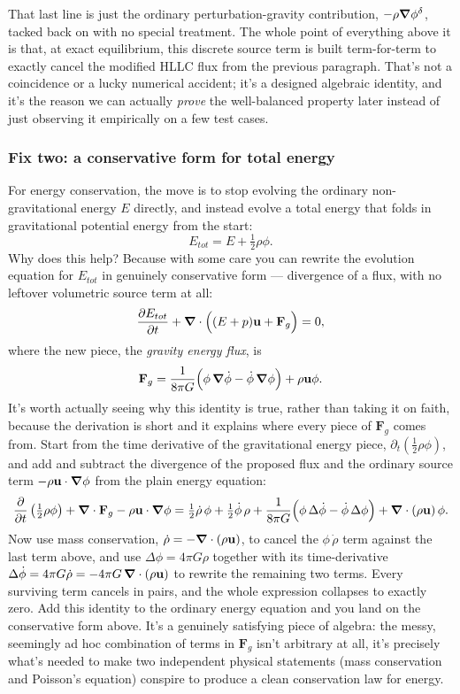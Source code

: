 That last line is just the ordinary perturbation-gravity contribution, $-\rho\grad\phi^\delta$, tacked back on with no special treatment. The whole point of everything above it is that, at exact equilibrium, this discrete source term is built term-for-term to exactly cancel the modified HLLC flux from the previous paragraph. That's not a coincidence or a lucky numerical accident; it's a designed algebraic identity, and it's the reason we can actually \emph{prove} the well-balanced property later instead of just observing it empirically on a few test cases.

\subsubsection{Fix two: a conservative form for total energy}

For energy conservation, the move is to stop evolving the ordinary non-gravitational energy $E$ directly, and instead evolve a total energy that folds in gravitational potential energy from the start:
\[
	E_{tot} = E + \tfrac12 \rho\phi.
\]
Why does this help? Because with some care you can rewrite the evolution equation for $E_{tot}$ in genuinely conservative form — divergence of a flux, with no leftover volumetric source term at all:
\[
	\pdv{E_{tot}}{t} + \grad\cdot\Big((E+p)\mathbf{u} + \mathbf{F}_g\Big) = 0,
\]
where the new piece, the \emph{gravity energy flux}, is
\[
	\mathbf{F}_g = \frac{1}{8\pi G}\Big(\phi\,\grad\dot\phi - \dot\phi\,\grad\phi\Big) + \rho\mathbf{u}\phi.
\]
It's worth actually seeing why this identity is true, rather than taking it on faith, because the derivation is short and it explains where every piece of $\mathbf{F}_g$ comes from. Start from the time derivative of the gravitational energy piece, $\partial_t(\tfrac12\rho\phi)$, and add and subtract the divergence of the proposed flux and the ordinary source term $-\rho\mathbf{u}\cdot\grad\phi$ from the plain energy equation:
\[
	\pdv{}{t}\left(\tfrac12\rho\phi\right) + \grad\cdot\mathbf{F}_g - \rho\mathbf{u}\cdot\grad\phi
	= \tfrac12\dot\rho\,\phi + \tfrac12\dot\phi\,\rho + \frac{1}{8\pi G}\Big(\phi\,\Delta\dot\phi - \dot\phi\,\Delta\phi\Big) + \grad\cdot(\rho\mathbf{u})\,\phi.
\]
Now use mass conservation, $\dot\rho = -\grad\cdot(\rho\mathbf{u})$, to cancel the $\phi\,\dot\rho$ term against the last term above, and use $\Delta\phi = 4\pi G\rho$ together with its time-derivative $\Delta\dot\phi = 4\pi G\dot\rho = -4\pi G\,\grad\cdot(\rho\mathbf{u})$ to rewrite the remaining two terms. Every surviving term cancels in pairs, and the whole expression collapses to exactly zero. Add this identity to the ordinary energy equation and you land on the conservative form above. It's a genuinely satisfying piece of algebra: the messy, seemingly ad hoc combination of terms in $\mathbf{F}_g$ isn't arbitrary at all, it's precisely what's needed to make two independent physical statements (mass conservation and Poisson's equation) conspire to produce a clean conservation law for energy.

